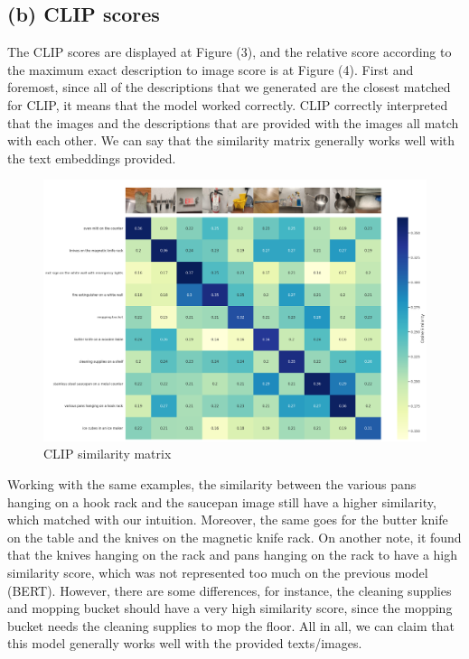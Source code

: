 \documentclass[]{article}
\begin{document}
\subsection{(b) CLIP scores}
The CLIP scores are displayed at Figure (3), and the relative score according to the maximum exact description to image score is at Figure (4). First and foremost, since all of the descriptions that we generated are the closest matched for CLIP, it means that the model worked correctly. CLIP correctly interpreted that the images and the descriptions that are provided with the images all match with each other. We can say that the similarity matrix generally works well with the text embeddings provided. 
\begin{figure}[h]
    \includegraphics[width=18cm]{scores/clipscores.png}
    \caption{CLIP similarity matrix}
\end{figure}

Working with the same examples, the similarity between the various pans hanging on a hook rack and the saucepan image still have a higher similarity, which matched with our intuition. Moreover, the same goes for the butter knife on the table and the knives on the magnetic knife rack. On another note, it found that the knives hanging on the rack and pans hanging on the rack to have a high similarity score, which was not represented too much on the previous model (BERT). However, there are some differences, for instance, the cleaning supplies and mopping bucket should have a very high similarity score, since the mopping bucket needs the cleaning supplies to mop the floor. All in all, we can claim that this model generally works well with the provided texts/images.
\end{document}
